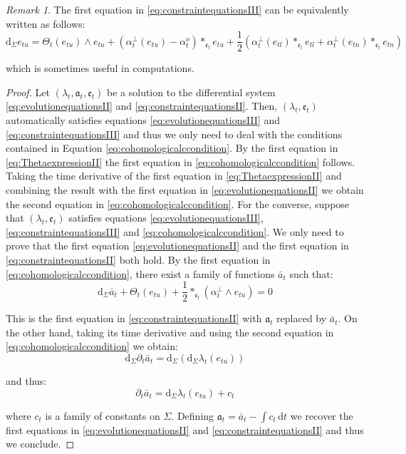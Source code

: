 \documentclass[10pt,reqno,a4paper]{amsart}
\theoremstyle{plain}
\theoremstyle{definition}
\theoremstyle{remark}
\newtheorem{remark}[thm]{Remark}
\theoremstyle{remark}
\def\dd{\mathrm{d}}
\def\fra{\mathfrak{a}}
\def\fre{\mathfrak{e}}
\renewcommand{\(}{ (}
\renewcommand{\)}{ )}
\begin{document}
\begin{remark}
The first equation in \eqref{eq:constraintequationsIII} can be equivalently written as follows:
\begin{equation*}
\dd_{\Sigma} e_{tu} = \Theta_t(e_{tu})\wedge e_{tu} +  (\alpha^{\perp}_t (e_{tu})   - \alpha^o_t  ) \ast_{\fre_t} e_{tu}  +\frac{1}{2} (\alpha^{\perp}_t(e_{tl}) \ast_{\fre_t} e_{tl} + \alpha^{\perp}_t(e_{tn}) \ast_{\fre_t} e_{tn}) 
\end{equation*}

\noindent
which is sometimes useful in computations. 
\end{remark}

\begin{proof}
Let $(\lambda_t,\fra_t,\fre_t)$ be a solution to the differential system \eqref{eq:evolutionequationsII} and \eqref{eq:constraintequationsII}. Then, $(\lambda_t , \fre_t)$ automatically satisfies equations \eqref{eq:evolutionequationsIII} and \eqref{eq:constraintequationsIII} and thus we only need to deal with the conditions contained in Equation \eqref{eq:cohomologicalccondition}. By the first equation in \eqref{eq:ThetaexpressionII} the first equation in \eqref{eq:cohomologicalccondition} follows. Taking the time derivative of the first equation in \eqref{eq:ThetaexpressionII} and combining the result with the first equation in \eqref{eq:evolutionequationsII}  we obtain the second equation in \eqref{eq:cohomologicalccondition}. For the converse, suppose that $(\lambda_t,\fre_t)$ satisfies equations \eqref{eq:evolutionequationsIII}, \eqref{eq:constraintequationsIII} and \eqref{eq:cohomologicalccondition}. We only need to prove that the first equation \eqref{eq:evolutionequationsII} and the first equation in \eqref{eq:constraintequationsII} both hold. By the first equation in \eqref{eq:cohomologicalccondition}, there exist a family of functions $\bar{a}_t$ such that:
\begin{equation*}
\dd_{\Sigma} \bar{a}_t + \Theta_t (e_{tu}) + \frac{1}{2}\ast_{\fre_t} (\alpha^{\perp}_t \wedge e_{tu}) = 0
\end{equation*}

\noindent
This is the first equation in \eqref{eq:constraintequationsII} with $\fra_t$ replaced by $\bar{a}_t$. On the other hand, taking its time derivative and using the second equation in \eqref{eq:cohomologicalccondition} we obtain:
\begin{equation*}
\dd_{\Sigma} \partial_t \bar{a}_t = \dd_{\Sigma}(\dd_{\Sigma}\lambda_t (e_{tu}))
\end{equation*}

\noindent
and thus:
\begin{equation*}
\partial_t \bar{a}_t = \dd_{\Sigma}\lambda_t (e_{tu}) + c_t
\end{equation*}

\noindent
where $c_t$ is a family of constants on $\Sigma$. Defining $\fra_t = \bar{a}_t - \int c_t \,\dd t$ we recover the first equations in \eqref{eq:evolutionequationsII} and \eqref{eq:constraintequationsII} and thus we conclude. 
\end{proof} 
 
\end{document}
